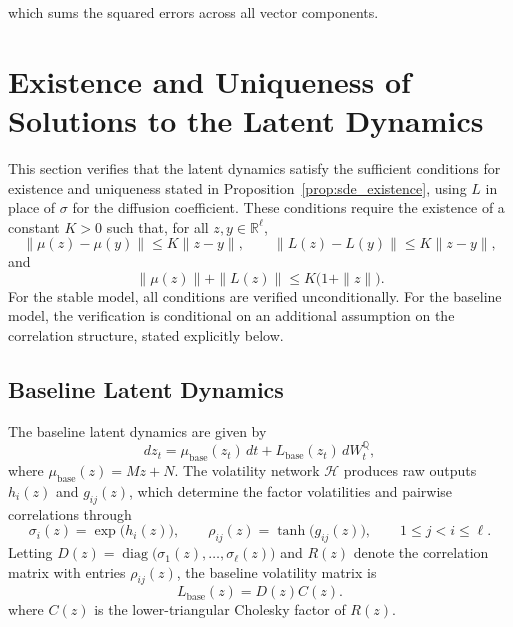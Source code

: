 which sums the squared errors across all vector components.









\section{Existence and Uniqueness of Solutions to the Latent Dynamics}
\label{app:sde_wellposed}

This section verifies that the latent dynamics satisfy the sufficient conditions for existence and uniqueness stated in Proposition~\ref{prop:sde_existence}, using $L$ in place of $\sigma$ for the diffusion coefficient. These conditions require the existence of a constant $K>0$ such that, for all $z,y\in\mathbb{R}^\ell$,
\[
\|\mu(z)-\mu(y)\|\leq K\|z-y\|,
\qquad
\|L(z)-L(y)\|\leq K\|z-y\|,
\]
and
\[
\|\mu(z)\|+\|L(z)\|\leq K\bigl(1+\|z\|\bigr).
\]
For the stable model, all conditions are verified unconditionally. For the baseline model, the verification is conditional on an additional assumption 
on the correlation structure, stated explicitly below.










\subsection{Baseline Latent Dynamics}
\label{app:baseline_sde_wellposed}

The baseline latent dynamics are given by
\begin{equation}
    dz_t
    =
    \mu_{\mathrm{base}}(z_t)\,dt
    +
    L_{\mathrm{base}}(z_t)\,dW_t^{\mathbb Q},
    \label{eq:app_baseline_sde}
\end{equation}
where $\mu_{\mathrm{base}}(z)=Mz+N$. The volatility network $\mathcal{H}$ produces raw outputs \(h_i(z)\) and \(g_{ij}(z)\), which determine the factor volatilities and pairwise correlations through
\[
    \sigma_i(z)=\exp\bigl(h_i(z)\bigr),
    \qquad
    \rho_{ij}(z)=\tanh\bigl(g_{ij}(z)\bigr),
    \qquad
    1\leq j<i\leq\ell.
\]
Letting $D(z)=\operatorname{diag}\bigl(\sigma_1(z),\ldots,\sigma_\ell(z)\bigr)$ and $R(z)$ denote the correlation matrix with entries $\rho_{ij}(z)$, the baseline volatility matrix is
\[
    L_{\mathrm{base}}(z)=D(z)C(z).
\]
where $C(z)$ is the lower-triangular Cholesky factor of $R(z)$.

